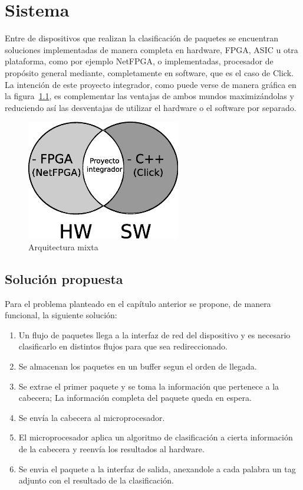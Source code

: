 \chapter{Sistema}

Entre de dispositivos que realizan la clasificación de paquetes se encuentran soluciones implementadas de manera completa en hardware, FPGA, ASIC u otra plataforma, como por ejemplo NetFPGA\cite{netfpga}, o implementadas, procesador de propósito general mediante, completamente en software, que es el caso de Click\cite{click}. La intención de este proyecto integrador, como puede verse de manera gráfica en la figura~\ref{fig:hwsw}, es complementar las ventajas de ambos mundos maximizándolas y reduciendo así las desventajas de utilizar el hardware o el software por separado. 


 \begin{figure}[h]
  \centering
	 \includegraphics[width=0.6\textwidth]{2-sistema/graf/interseccion.eps}
  \caption{Arquitectura mixta}
  \label{fig:hwsw}
\end{figure}


\section{Solución propuesta}

Para el problema planteado en el capítulo anterior se propone, de manera funcional, la siguiente solución: 

    \begin{enumerate}
  	\item Un flujo de paquetes llega a la interfaz de red del dispositivo y es necesario clasificarlo en distintos flujos para que sea redireccionado.
	\item Se almacenan los paquetes en un buffer segun el orden de llegada.
	\item Se extrae el primer paquete y se toma la información que pertenece a la cabecera; La información completa del paquete queda en espera.
	\item Se envía la cabecera al microprocesador.
	\item El microprocesador aplica un algoritmo de clasificación a cierta información de la cabecera y reenvía los resultados al hardware. 
	\item Se envia el paquete a la interfaz de salida, anexandole a cada palabra un tag adjunto con el resultado de la clasificación.
    \end{enumerate}
\newpage
